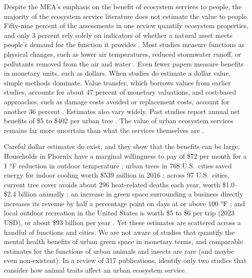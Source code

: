 \documentclass[12pt]{article}
\begin{document}
Despite the MEA's emphasis on the benefit of ecosystem services to people, the majority of the ecosystem service literature does not estimate the value to people. Fifty-nine percent of the assessments in one review quantify ecosystem properties, and only 3 percent rely solely on indicators of whether a natural asset meets people's demand for the function it provides \citep{veerkampReviewStudiesAssessing2021}. Most studies measure functions as physical changes, such as lower air temperatures, reduced stormwater runoff, or pollutants removed from the air and water \citep{veerkampReviewStudiesAssessing2021}. Even fewer papers measure benefits in monetary units, such as dollars. When studies do estimate a dollar value, simple methods dominate. Value transfer, which borrows values from earlier studies, accounts for about 47 percent of monetary valuations, and cost-based approaches, such as damage costs avoided or replacement costs, account for another 36 percent \citep{maReviewMethodsQuantifying2025}. Estimates also vary widely. Past studies report annual net benefits of \$5 to \$402 per urban tree \citep{keelerSocialecologicalTechnologicalFactors2019}. The value of urban ecosystem services remains far more uncertain than what the services themselves are \citep{keelerSocialecologicalTechnologicalFactors2019}.

Careful dollar estimates do exist, and they show that the benefits can be large. Households in Phoenix have a marginal willingness to pay of \$72 per month for a 1 °F reduction in outdoor temperature \citep{klaiberItLessHot2017}; urban trees in 768 U.S.\ cities saved energy for indoor cooling worth \$539 million in 2016 \citep{herisPilotingUrbanEcosystem2021}; across 97 U.S.\ cities, current tree cover avoids about 296 heat-related deaths each year, worth \$1.0--\$2.4 billion annually \citep{mcdonaldValueUSUrban2020}; an increase in green space surrounding a business directly increases its revenue by half a percentage point on days at or above 100 °F \citep{creelValueNatureBasedAdaptation2026}; and local outdoor recreation in the United States is worth \$5 to \$6 per trip (2023 USD), or about \$93 billion per year \citep{creelNationalValueLocal2026}. Yet these estimates are scattered across a handful of functions and cities. We are not aware of studies that quantify the mental health benefits of urban green space in monetary terms, and comparable estimates for the functions of urban animals and insects are rare (and maybe even non-existent). In a review of 317 publications, \citet{schwarzUnderstandingBiodiversityecosystemService2017} identify only two studies that consider how animal traits affect an urban ecosystem service.
\end{document}
